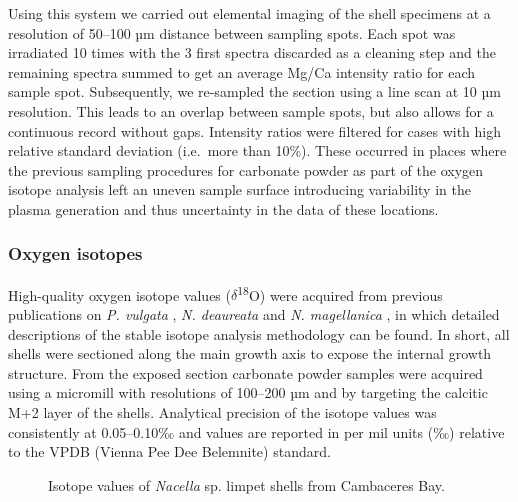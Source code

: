 \documentclass[
  authoryear,
  preprint,
  3p]{elsarticle}
\begin{document}
Using this system we carried out elemental imaging of the shell
specimens at a resolution of 50--100 µm distance between sampling spots.
Each spot was irradiated 10 times with the 3 first spectra discarded as
a cleaning step and the remaining spectra summed to get an average Mg/Ca
intensity ratio for each sample spot. Subsequently, we re-sampled the
section using a line scan at 10 µm resolution. This leads to an overlap
between sample spots, but also allows for a continuous record without
gaps. Intensity ratios were filtered for cases with high relative
standard deviation (i.e.~more than 10\%). These occurred in places where
the previous sampling procedures for carbonate powder as part of the
oxygen isotope analysis left an uneven sample surface introducing
variability in the plasma generation and thus uncertainty in the data of
these locations.

\subsubsection{Oxygen isotopes}\label{oxygen-isotopes}

High-quality oxygen isotope values (\(\delta\)\textsuperscript{18}O)
were acquired from previous publications on \emph{P. vulgata}
\citep{Surge2012-ba, Graniero2017-io}, \emph{N. deaureata} and \emph{N.
magellanica} \citep{Nicastro2020-ih}, in which detailed descriptions of
the stable isotope analysis methodology can be found. In short, all
shells were sectioned along the main growth axis to expose the internal
growth structure. From the exposed section carbonate powder samples were
acquired using a micromill with resolutions of 100--200 µm and by
targeting the calcitic M+2 layer of the shells. Analytical precision of
the isotope values was consistently at 0.05--0.10‰ and values are
reported in per mil units (‰) relative to the VPDB (Vienna Pee Dee
Belemnite) standard.

\begin{figure}


\caption{\label{fig-Nac_iso}Isotope values of \emph{Nacella} sp. limpet
shells from Cambaceres Bay.}

\end{figure}%
\end{document}
